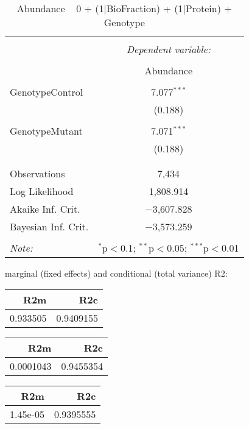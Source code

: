 \documentclass[11pt]{report}
\begin{document}
\begin{table}[!htbp] \centering 
  \caption{Abundance ~ 0 + (1|BioFraction) + (1|Protein) + Genotype} 
  \label{} 
\begin{tabular}{@{\extracolsep{5pt}}lc} 
\\[-1.8ex]\hline 
\hline \\[-1.8ex] 
 & \multicolumn{1}{c}{\textit{Dependent variable:}} \\ 
\cline{2-2} 
\\[-1.8ex] & Abundance \\ 
\hline \\[-1.8ex] 
 GenotypeControl & 7.077$^{***}$ \\ 
  & (0.188) \\ 
  & \\ 
 GenotypeMutant & 7.071$^{***}$ \\ 
  & (0.188) \\ 
  & \\ 
\hline \\[-1.8ex] 
Observations & 7,434 \\ 
Log Likelihood & 1,808.914 \\ 
Akaike Inf. Crit. & $-$3,607.828 \\ 
Bayesian Inf. Crit. & $-$3,573.259 \\ 
\hline 
\hline \\[-1.8ex] 
\textit{Note:}  & \multicolumn{1}{r}{$^{*}$p$<$0.1; $^{**}$p$<$0.05; $^{***}$p$<$0.01} \\ 
\end{tabular} 
\end{table} 
marginal (fixed effects) and conditional (total variance) R2:

\begin{tabular}{r|r}
\hline
R2m & R2c\\
\hline
0.933505 & 0.9409155\\
\hline
\end{tabular}

\begin{tabular}{r|r}
\hline
R2m & R2c\\
\hline
0.0001043 & 0.9455354\\
\hline
\end{tabular}

\begin{tabular}{r|r}
\hline
R2m & R2c\\
\hline
1.45e-05 & 0.9395555\\
\hline
\end{tabular}
\end{document}
